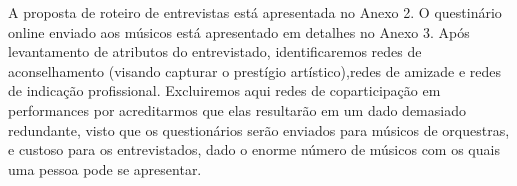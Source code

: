 \documentclass[a4paper, 12pt, openright, oneside, german, french, english, brazil]{abntex2}
\begin{document}











	A proposta de roteiro de entrevistas está apresentada no Anexo 2. O questinário online enviado aos músicos está apresentado em detalhes no Anexo 3. Após levantamento de atributos do entrevistado, identificaremos redes de aconselhamento (visando capturar o prestígio artístico),redes de amizade e redes de indicação profissional. Excluiremos aqui redes de coparticipação em performances por acreditarmos que elas resultarão em um dado demasiado redundante, visto que os questionários serão enviados para músicos de orquestras, e custoso para os entrevistados, dado o enorme número de músicos com os quais uma pessoa pode se apresentar.
\end{document}
